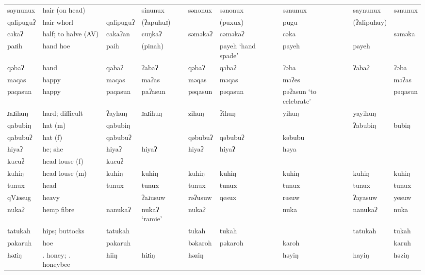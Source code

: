 \begin{landscape}
\begin{longtable}{*{9}{>{\raggedright\arraybackslash}p{}}}
\text{*}saynunux     & hair (on head) &  & sinunux & sənonux & sənonux & sənunux & saynunux & sənunux\\
\text{*}qalipuguʔ    & hair whorl & qalipuguʔ & (ʔapuhuɹ) &  & (puxux) & pugu & (ʔalipuhuy) & \\
\text{*}cəkaʔ        & half; to halve (AV) & cakaʔan & cuŋkaʔ & səməkaʔ & cəməkaʔ & cəka &  & səməka\\
\text{*}paɹih        & hand hoe & paih & (pinah) &  & payeh \newline `hand spade' & payeh & payeh & \\
\text{*}qəbaʔ        & hand & qabaʔ & ʔabaʔ & qəbaʔ & qəbaʔ & ʔəba & ʔabaʔ & ʔəba\\
\text{*}maqas        & happy & maqas & maʔas & məqas & məqas & məʔes &  & məʔas\\
\text{*}paqasun      & happy & paqasun & paʔasun & pəqasun & pəqasun & pəʔasun \newline `to celebrate' &  & pəqasun\\
\text{*}ɹaɹihuŋ      & hard; difficult & ʔayhuŋ & ɹaɹihuŋ & zihuŋ & ʔihuŋ & yihuŋ & yayihuŋ & \\
\text{*}qabubiŋ      & hat (m) & qabubiŋ &  &  &  &  & ʔabubiŋ & bubiŋ\\
\text{*}qabubuʔ      & hat (f) & qabubuʔ &  & qəbubuʔ & qəbubuʔ & kəbubu &  & \\
\text{*}hiyaʔ        & he; she & hiyaʔ & hiyaʔ & hiyaʔ & hiyaʔ & həya &  & \\
\text{*}kucuʔ        & head louse (f) & kucuʔ &  &  &  &  &  & \\
\text{*}kuhiŋ        & head louse (m) & kuhiŋ & kuhiŋ & kuhiŋ & kuhiŋ & kuhiŋ & kuhiŋ & kuhiŋ\\
\text{*}tunux        & head & tunux & tunux & tunux & tunux & tunux & tunux & tunux\\
\text{*}qVɹəsug      & heavy &  & ʔaɹusuw & rəʔusuw & qesux & rəsuw & ʔayasuw & yesuw\\
\text{*}nukaʔ        & hemp fibre & nanukaʔ & nukaʔ `ramie' & nukaʔ &  & nuka & nanukaʔ & nuka\\
\text{*}tatukah      & hips; buttocks & tatukah &  & tukah & tukah &  & tatukah & tukah\\
\text{*}pakaruh      & hoe & pakaruh &  & bəkaroh & pəkaroh & karoh &  & karuh\\
\text{*}həɹiŋ        & 1. honey; \newline 2. honeybee & hiiŋ & hiɹiŋ & həziŋ &  & həyiŋ & hayiŋ & həziŋ\\

\end{longtable}
\end{landscape}
